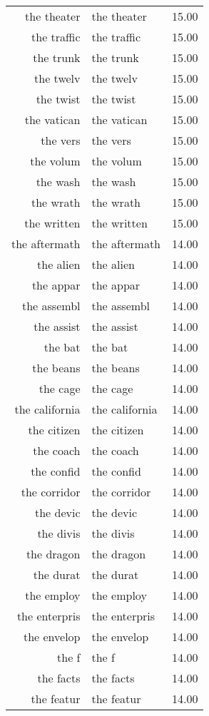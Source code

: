 \begin{table}[ht]
\begin{tabular}{rlr}
  the theater & the theater & 15.00 \\ 
  the traffic & the traffic & 15.00 \\ 
  the trunk & the trunk & 15.00 \\ 
  the twelv & the twelv & 15.00 \\ 
  the twist & the twist & 15.00 \\ 
  the vatican & the vatican & 15.00 \\ 
  the vers & the vers & 15.00 \\ 
  the volum & the volum & 15.00 \\ 
  the wash & the wash & 15.00 \\ 
  the wrath & the wrath & 15.00 \\ 
  the written & the written & 15.00 \\ 
  the aftermath & the aftermath & 14.00 \\ 
  the alien & the alien & 14.00 \\ 
  the appar & the appar & 14.00 \\ 
  the assembl & the assembl & 14.00 \\ 
  the assist & the assist & 14.00 \\ 
  the bat & the bat & 14.00 \\ 
  the beans & the beans & 14.00 \\ 
  the cage & the cage & 14.00 \\ 
  the california & the california & 14.00 \\ 
  the citizen & the citizen & 14.00 \\ 
  the coach & the coach & 14.00 \\ 
  the confid & the confid & 14.00 \\ 
  the corridor & the corridor & 14.00 \\ 
  the devic & the devic & 14.00 \\ 
  the divis & the divis & 14.00 \\ 
  the dragon & the dragon & 14.00 \\ 
  the durat & the durat & 14.00 \\ 
  the employ & the employ & 14.00 \\ 
  the enterpris & the enterpris & 14.00 \\ 
  the envelop & the envelop & 14.00 \\ 
  the f & the f & 14.00 \\ 
  the facts & the facts & 14.00 \\ 
  the featur & the featur & 14.00 \\ 

\end{tabular}
\end{table}
